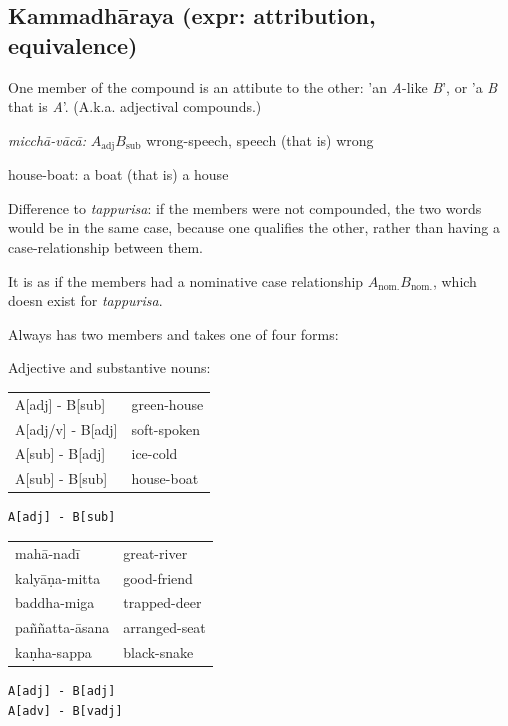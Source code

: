 \documentclass[11pt,oneside]{memoir}
\begin{document}
\subsection{Kammadhāraya (expr: attribution, equivalence)}
\label{sec:org05e9f2e}

One member of the compound is an attibute to the other: 'an \emph{A}-like \emph{B}', or 'a
\emph{B} that is \emph{A}'. (A.k.a. adjectival compounds.)

\emph{micchā-vācā:} \(A_{\text{adj}} B_{\text{sub}}\) wrong-speech, speech (that is) wrong

house-boat: a boat (that is) a house

Difference to \emph{tappurisa}: if the members were not compounded, the two words
would be in the same case, because one qualifies the other, rather than having a
case-relationship between them.

It is as if the members had a nominative case relationship \(A_{\text{nom.}}
B_{\text{nom.}}\), which doesn exist for \emph{tappurisa}.

Always has two members and takes one of four forms:

Adjective and substantive nouns:

\begin{center}
\begin{tabular}{ll}
A[adj] - B[sub] & green-house\\
A[adj/v] - B[adj] & soft-spoken\\
A[sub] - B[adj] & ice-cold\\
A[sub] - B[sub] & house-boat\\
\end{tabular}
\end{center}

\begin{verbatim}
A[adj] - B[sub]
\end{verbatim}


\begin{center}
\begin{tabular}{ll}
mahā-nadī & great-river\\
kalyāṇa-mitta & good-friend\\
baddha-miga & trapped-deer\\
paññatta-āsana & arranged-seat\\
kaṇha-sappa & black-snake\\
\end{tabular}
\end{center}

\begin{verbatim}
A[adj] - B[adj]
A[adv] - B[vadj]
\end{verbatim}
\end{document}
